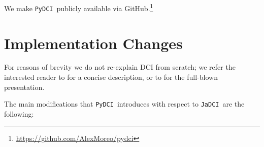 \documentclass{article}
\newif\ifdraft
\newcommand{\fabscomment}[1]{\ifdraft{\leavevmode\color{cyan}[FS]: {#1}}\else{\vspace{0ex}}\fi}
\newcommand{\jadci}{\texttt{JaDCI}}
\newcommand{\pydci}{\texttt{PyDCI}}
\begin{document}
We make \pydci\ publicly available via
GitHub.\footnote{\url{https://github.com/AlexMoreo/pydci}}



\section{Implementation Changes}\label{sec:changes}

\noindent For reasons of brevity we do not re-explain DCI from
scratch;
we refer the interested reader to \citep{Moreo-Fernandez:2018ss} for a
concise description, or to \citep{Moreo:2016fg} for the full-blown
presentation.

The main modifications that \pydci\ introduces with respect to \jadci\
are the following:
\end{document}
